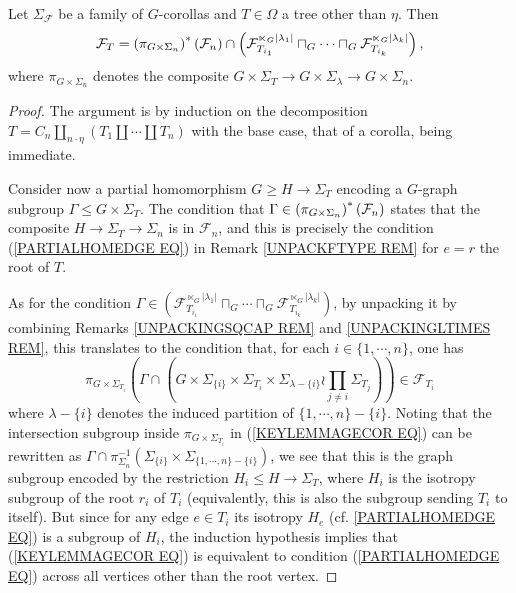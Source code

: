 \documentclass[a4paper,10pt]{article}%
\begin{document}
\begin{lemma}\label{KEYLEMMAGECO LEM}
Let $\Sigma_\mathcal{F}$ be a family of $G$-corollas and 
$T \in \Omega$ a tree other than $\eta$. Then
\begin{equation}\label{KEYLEMMAGECO EQ}
	\mathcal{F}_T =
	\left(\pi_{G \times \Sigma_n}\right)^{\**}(\mathcal{F}_n)
		\cap
	\left(
	\mathcal{F}_{T_{i_1}}^{\ltimes_G |\lambda_1|}
		\sqcap_G \cdots \sqcap_G
	\mathcal{F}_{T_{i_k}}^{\ltimes_G |\lambda_k|}
	\right),
\end{equation}
where $\pi_{G \times \Sigma_n}$ denotes the composite
$G \times \Sigma_T \to G \times \Sigma_{\lambda} \to
 G \times \Sigma_n$.
\end{lemma}



\begin{proof} The argument is by induction on the decomposition
$T= C_n \amalg_{n \cdot \eta}(T_1 \amalg \cdots \amalg T_n)$
with the base case, that of a corolla, being immediate.

	Consider now a partial homomorphism $G \geq H \to \Sigma_T$ encoding a 
	$G$-graph subgroup $\Gamma \leq G \times \Sigma_T$.
	The condition that $\Gamma \in \left(\pi_{G \times \Sigma_n}\right)^{\**}(\mathcal{F}_n)$ states that the composite $H \to \Sigma_T \to \Sigma_n$ is in $\mathcal{F}_n$, 
	and this is precisely the condition (\ref{PARTIALHOMEDGE EQ}) in Remark \ref{UNPACKFTYPE REM}
	for $e=r$ the root of $T$.

As for the condition 
	$ \Gamma \in 
	\left(
	\mathcal{F}_{T_{i_1}}^{\ltimes_G |\lambda_1|}
		\sqcap_G \cdots \sqcap_G
	\mathcal{F}_{T_{i_k}}^{\ltimes_G |\lambda_k|}
	\right)	$, by unpacking it by combining 
	Remarks \ref{UNPACKINGSQCAP REM} and 
	\ref{UNPACKINGLTIMES REM},
	this translates to the condition that, for each $i \in \{1,\cdots,n\}$, one has
	\begin{equation}\label{KEYLEMMAGECOR EQ}
	\pi_{G \times \Sigma_{T_i}}
	\left(
		\Gamma \cap 
	\left(
		G \times \Sigma_{\{i\}} \times \Sigma_{T_i}
		\times 
		\Sigma_{\lambda-\{i\}} \wr \prod_{j\neq i} \Sigma_{T_j}
	\right)
	\right)	
	\in \mathcal{F}_{T_i}
	\end{equation}
where $\lambda - \{i\}$ denotes the induced partition of 
$\{1,\cdots,n\} - \{i\}$. Noting that the intersection subgroup  inside $\pi_{G \times \Sigma_{T_i}}$ in (\ref{KEYLEMMAGECOR EQ}) can be rewritten as 
$\Gamma \cap \pi_{\Sigma_n}^{-1}
(\Sigma_{\{i\}} \times \Sigma_{\{1,\cdots,n\} - \{i\}})$,
we see that this is the graph subgroup encoded by the restriction $H_i \leq H \to \Sigma_T$, where $H_i$ is the isotropy subgroup of the root $r_i$ of $T_i$ (equivalently, this is also the subgroup sending $T_i$ to itself).
But since for any edge $e \in T_i$ its isotropy $H_e$ 
(cf. \ref{PARTIALHOMEDGE EQ}) is a subgroup of $H_i$, the induction hypothesis implies that (\ref{KEYLEMMAGECOR EQ})
is equivalent to condition (\ref{PARTIALHOMEDGE EQ}) 
across all vertices other than the root vertex.


\end{proof}
\end{document}
